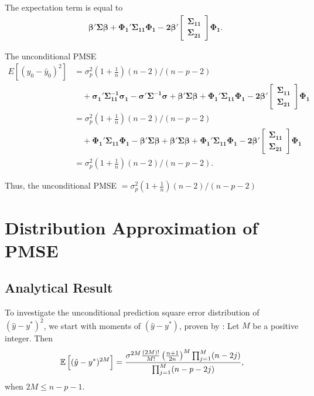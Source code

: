 The expectation term is equal to
$$\begin{aligned}
&\boldsymbol{\beta'\Sigma\beta+\Phi_1'\Sigma_{11}\Phi_1-2\beta'}
\begin{bmatrix}\boldsymbol{\Sigma_{11}}\\
\boldsymbol{\Sigma_{21}}\end{bmatrix}\boldsymbol{\Phi_1}.
\end{aligned}$$

The unconditional PMSE 
$$\begin{aligned}
E[(y_0-\tilde{y_0})^2] 
&= \sigma_p^2(1+\frac{1}{n})(n-2)/(n-p-2)\\
&\quad+\boldsymbol{\sigma_1'\Sigma_{11}^{-1}\sigma_1-\sigma'\Sigma^{-1}\sigma}+\boldsymbol{\beta'\Sigma\beta+\Phi_1'\Sigma_{11}\Phi_1-2\beta'}
\begin{bmatrix}\boldsymbol{\Sigma_{11}}\\
\boldsymbol{\Sigma_{21}}\end{bmatrix}\boldsymbol{\Phi_1}\\
&= \sigma_p^2(1+\frac{1}{n})(n-2)/(n-p-2)\\
&\quad+\boldsymbol{\Phi_1'\Sigma_{11}\Phi_1-\beta'\Sigma\beta}+\boldsymbol{\beta'\Sigma\beta+\Phi_1'\Sigma_{11}\Phi_1-2\beta'}
\begin{bmatrix}\boldsymbol{\Sigma_{11}}\\
\boldsymbol{\Sigma_{21}}\end{bmatrix}\boldsymbol{\Phi_1}\\
&= \sigma_p^2(1+\frac{1}{n})(n-2)/(n-p-2).
\end{aligned}$$

Thus, the unconditional PMSE $=\sigma_p^2(1+\frac{1}{n})(n-2)/(n-p-2)$


\section{Distribution Approximation of PMSE}
\subsection{Analytical Result}
To investigate the unconditional prediction square error distribution of $(\hat{y}-y^*)^2$, we start with moments of $(\hat{y}-y^*)$, proven by \cite{sawyer1982sample}:
Let $M$ be a positive integer. Then 
$$\mathbb{E}\left[(\hat{y}-y^*)^{2M}\right] = \frac{\sigma^{2M}\frac{(2M)!}{M!}\left(\frac{n+1}{2n}\right)^M\prod^M_{j=1}(n-2j)}{\prod^M_{j=1}(n-p-2j)},$$
when $2M\leq n-p-1$.

